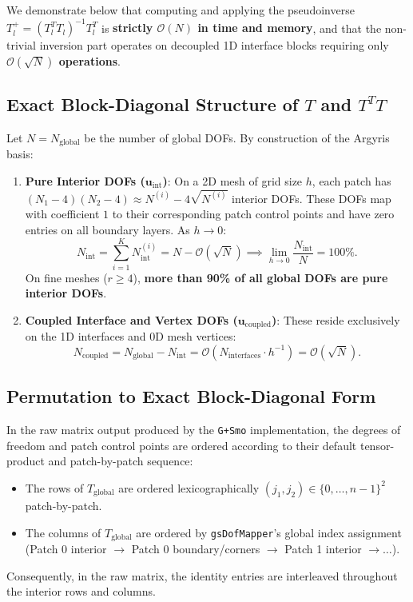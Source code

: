 \documentclass[11pt,a4paper]{article}
\begin{document}
We demonstrate below that computing and applying the pseudoinverse $T_l^+ = (T_l^T T_l)^{-1} T_l^T$ is \textbf{strictly $\mathcal{O}(N)$ in time and memory}, and that the non-trivial inversion part operates on decoupled 1D interface blocks requiring only \textbf{$\mathcal{O}(\sqrt{N})$ operations}.

\subsection{Exact Block-Diagonal Structure of $T$ and $T^T T$}
Let $N = N_{\text{global}}$ be the number of global DOFs. By construction of the Argyris basis:
\begin{enumerate}
    \item \textbf{Pure Interior DOFs ($\mathbf{u}_{\text{int}}$)}: On a 2D mesh of grid size $h$, each patch has $(N_1-4)(N_2-4) \approx N^{(i)} - 4\sqrt{N^{(i)}}$ interior DOFs. These DOFs map with coefficient $1$ to their corresponding patch control points and have zero entries on all boundary layers. As $h \to 0$:
    \begin{equation}
        N_{\text{int}} = \sum_{i=1}^K N_{\text{int}}^{(i)} = N - \mathcal{O}(\sqrt{N}) \implies \lim_{h \to 0} \frac{N_{\text{int}}}{N} = 100\%.
    \end{equation}
    On fine meshes ($r \ge 4$), \textbf{more than 90\% of all global DOFs are pure interior DOFs}.
    \item \textbf{Coupled Interface and Vertex DOFs ($\mathbf{u}_{\text{coupled}}$)}: These reside exclusively on the 1D interfaces and 0D mesh vertices:
    \begin{equation}
        N_{\text{coupled}} = N_{\text{global}} - N_{\text{int}} = \mathcal{O}(N_{\text{interfaces}} \cdot h^{-1}) = \mathcal{O}(\sqrt{N}).
    \end{equation}
\end{enumerate}

\subsection{Permutation to Exact Block-Diagonal Form}
In the raw matrix output produced by the \texttt{G+Smo} implementation, the degrees of freedom and patch control points are ordered according to their default tensor-product and patch-by-patch sequence:
\begin{itemize}
    \item The rows of $T_{\text{global}}$ are ordered lexicographically $(j_1, j_2) \in \{0, \dots, n-1\}^2$ patch-by-patch.
    \item The columns of $T_{\text{global}}$ are ordered by \texttt{gsDofMapper}'s global index assignment (Patch 0 interior $\to$ Patch 0 boundary/corners $\to$ Patch 1 interior $\to \dots$).
\end{itemize}
Consequently, in the raw matrix, the identity entries are interleaved throughout the interior rows and columns.
\end{document}
